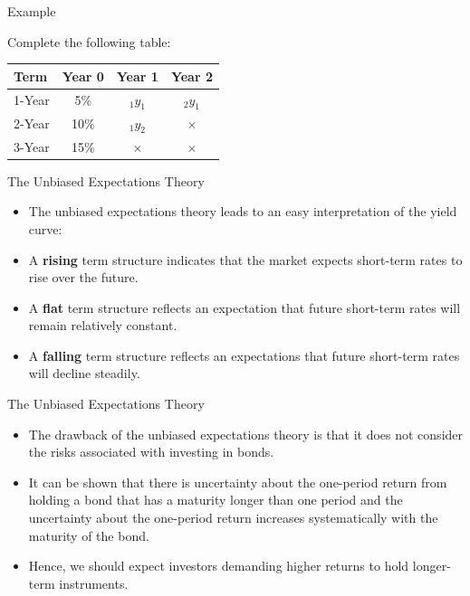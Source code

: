 \documentclass{beamer}
\begin{document}
\begin{frame}{Example}
    \begin{center}
        Complete the following table:
    \end{center}
    
    \begin{table}[H]
    \begin{center}
        \begin{tabular}{lccc}
            Term & Year 0 & Year 1 & Year 2 \\ \hline
            1-Year & 5\% & $_{1}y_{1}$ & $_{2}y_{1}$\\
            2-Year & 10\% & $_{1}y_{2}$ & $\times$ \\
            3-Year & 15\% & $\times$ & $\times$
        \end{tabular}
    \end{center}
\end{table}
\end{frame}

\begin{frame}{The Unbiased Expectations Theory}
\begin{itemize}
\item The unbiased expectations theory leads to an easy interpretation of the yield curve:
\item A \textbf{rising} term structure indicates that the market expects short-term rates to rise over the future.
\item A \textbf{flat} term structure reflects an expectation that future short-term rates will remain relatively constant.
\item A \textbf{falling} term structure reflects an expectations that future short-term rates will decline steadily. 
\end{itemize}
\end{frame}

\begin{frame}{The Unbiased Expectations Theory}
\begin{itemize}
    \item The drawback of the unbiased expectations theory is that it does not consider the risks associated with investing in bonds.
    \item It can be shown that there is uncertainty about the one-period return from holding a bond that has a maturity longer than one period and the uncertainty about the one-period return increases systematically with the maturity of the bond. 
    \item Hence, we should expect investors demanding higher returns to hold longer-term instruments. 
\end{itemize}
\end{frame}
\end{document}
